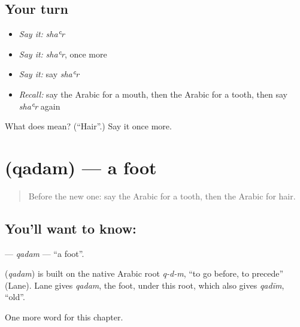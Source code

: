 \subsection*{Your turn}
\begin{itemize}
\raggedright
  \item \emph{Say it:} \emph{shaʿr}
  \item \emph{Say it:} \emph{shaʿr}, once more
  \item \emph{Say it:} say \emph{shaʿr}
  \item \emph{Recall:} say the Arabic for a mouth, then the Arabic for a tooth, then say \emph{shaʿr} again
\end{itemize}

\begin{tcolorbox}[breakable,colback=teal!4,colframe=teal!35!black,title={Before you move on}]
What does  mean? (\textquotedblleft{}Hair\textquotedblright{}.) Say it once more.
\end{tcolorbox}
\section[\texorpdfstring{\ar{قدم} (qadam)}{قدم (qadam)}]{ (qadam) — a foot}

\label{lesson:AR-C51-qadam}



\begin{quote}
Before the new one: say the Arabic for a tooth, then the Arabic for hair.
\end{quote}

\subsection*{You'll want to know: }
\textbf{} — \emph{qadam} — \textquotedblleft{}a foot\textquotedblright{}.

\begin{cousinweb}
\textbf{} (\emph{qadam}) is built on the native Arabic root \emph{q-d-m}, \textquotedblleft{}to go before, to precede\textquotedblright{} (Lane). Lane gives \emph{qadam}, the foot, under this root, which also gives \emph{qadīm}, \textquotedblleft{}old\textquotedblright{}.
\end{cousinweb}

\begin{grammarlens}[title={What you've built}]
One more word for this chapter.
\end{grammarlens}

